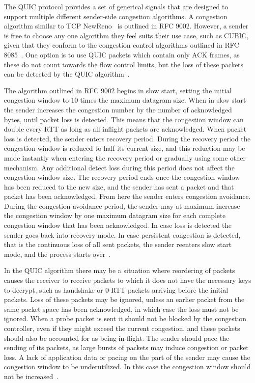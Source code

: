\documentclass[english, 12pt, a4paper, elec, utf8, a-2b, online]{aaltothesis}
\begin{document}
The QUIC protocol provides a set of generical signals that are designed to support
multiple different sender-side congestion algorithms. A congestion algorithm similar
to TCP NewReno~\cite{rfc6582} is outlined in RFC 9002. However, a sender is free to
choose any one algorithm they feel suits their use case, such as CUBIC, given that they conform
to the congestion control algorithms outlined in RFC 8085~\cite{rfc8085}. One option
is to use QUIC packets which contain only ACK frames, as these do not count towards
the flow control limits, but the loss of these packets can be detected by the QUIC
algorithm~\cite{rfc9002}.

The algorithm outlined in RFC 9002 begins in slow start, setting the initial congestion
window to 10 times the maximum datagram size. When in slow start the sender increases
the congestion number by the number of acknowledged bytes, until packet loss is detected. This
means that the congestion window can double every RTT as long as all inflight packets
are acknowledged. When packet loss is detected, the sender enters recovery period.
During the recovery period the congestion window is reduced to half its current
size, and this reduction may be made instantly when entering the recovery period
or gradually using some other mechanism. Any additional detect loss during this
period does not affect the congestion window size. The recovery period ends once
the congestion window has been reduced to the new size, and the sender has sent
a packet and that packet has been acknowledged. From here the sender enters congestion 
avoidance. During the congestion avoidance period, the sender may at maximum increase
the congestion window by one maximum datagram size for each complete congestion
window that has been acknowledged. In case loss is detected the sender goes back
into recovery mode. In case persistent congestion is detected, that is the continuous
loss of all sent packets, the sender reenters slow start mode, and the process
starts over~\cite{rfc9002}.

In the QUIC algorithm there may be a situation where reordering of packets causes
the receiver to receive packets to which it does not have the necessary keys to
decrypt, such as handshake or 0-RTT packets arriving before the initial packets.
Loss of these packets may be ignored, unless an earlier packet from the same packet space
has been acknowledged, in which case the loss must not be ignored. When a probe
packet is sent it should not be blocked by the congestion controller, even if they might exceed the current
congestion, and these packets should also be accounted for as being in-flight. The
sender should pace the sending of its packets, as large bursts of packets may induce 
congestion or packet loss. A lack of application data or pacing on the part of the
sender may cause the congestion window to be underutilized. In this case the congestion
window should not be increased~\cite{rfc9002}.
\end{document}
